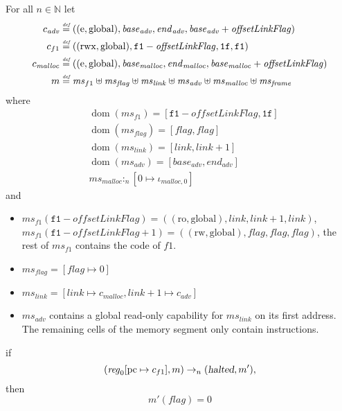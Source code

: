 \documentclass[a4paper]{article}
\newcommand{\forcenewline}{$\phantom{v}$\\}
\newcommand{\update}[2]{[#1 \mapsto #2]}
\newcommand{\defeq}{\stackrel{\textit{\tiny{def}}}{=}}
\DeclareMathOperator{\dom}{dom}
\newcommand{\var}[1]{\mathit{#1}}
\newcommand{\hs}{\var{ms}}
\newcommand{\ms}{\hs}
\newcommand{\pcreg}{\mathrm{pc}}
\newcommand{\start}{\var{base}}
\newcommand{\addrend}{\var{end}}
\newcommand{\reg}{\var{reg}}
\newcommand{\heap}{\var{mem}}
\newcommand{\adv}{\var{adv}}
\newcommand{\link}{\var{link}}
\newcommand{\flag}{\var{flag}}
\newcommand{\olf}{\var{offsetLinkFlag}}
\newcommand{\halted}{\textsl{halted}}
\newcommand{\heapSat}[3][\heap]{#1 :_{#2} #3}
\newcommand{\codelabel}[1]{\mathit{#1}}
\newcommand{\malloc}{\codelabel{malloc}}
\newcommand{\nats}{\mathbb{N}}
\newcommand{\plainperm}[1]{\mathrm{#1}}
\newcommand{\readonly}{\plainperm{ro}}
\newcommand{\readwrite}{\plainperm{rw}}
\newcommand{\entry}{\plainperm{e}}
\newcommand{\rwx}{\plainperm{rwx}}
\newcommand{\glob}{\plainperm{global}}
\newcommand{\step}[1][]{\rightarrow_{#1}}
\begin{document}
\begin{lemma} \forcenewline
  \label{lem:correctness-f1}
  For all $n \in \nats$
  let
  \begin{align*}
    c_{\var{adv}} & \defeq ((\entry,\glob),\start_{\adv},\addrend_{\adv},\start_{\adv}+\olf) \\
    c_{f1} & \defeq ((\rwx,\glob),\mathtt{f1}-\olf,\mathtt{1f},\mathtt{f1}) \\
    c_\malloc & \defeq ((\entry,\glob),\start_\malloc,\addrend_\malloc,\start_\malloc+\olf) \\
    m & \defeq \hs_{f1} \uplus 
        \hs_\flag \uplus                
        \ms_{\var{link}} \uplus 
        \hs_\adv \uplus 
        \ms_{\malloc} \uplus 
        \hs_{\var{frame}} 
  \end{align*}
  where 
  \begin{align*}
    &\dom(\hs_{f1}) = [\mathtt{f1}-\olf,\mathtt{1f}] \\
    &\dom(\hs_\flag) = [\flag,\flag] \\
    &\dom(\ms_\link) = [\link,\link+1]\\
    &\dom(\hs_{\adv}) = [\start_\adv,\addrend_\adv] \\
    &\heapSat[\hs_{\malloc}]{n}{[0 \mapsto \iota_{\malloc,0}]}
  \end{align*}
  and
  \begin{itemize}
  \item $\ms_{f1}(\mathtt{f1}-\olf) = ((\readonly,\glob),\link,\link+1,\link)$, $\ms_{f1}(\mathtt{f1}-\olf+1) = ((\readwrite,\glob),\flag,\flag,\flag)$, the rest of $\hs_{f1}$ contains the code of $f1$.
  \item $\ms_\flag = [\flag \mapsto 0]$
  \item $\ms_{\var{link}} = [\var{link} \mapsto c_\malloc, \var{link} + 1 \mapsto c_\adv]$
  \item $\hs_\adv$ contains a global read-only capability for $\hs_\link$ on its first address. The remaining cells of the memory segment only contain instructions.
  \end{itemize}
  if 
  \[
    (\reg_0\update{\pcreg}{c_{f1}},m) \step[n] (\halted,m'),
  \]
  then
  \[
    m'(\flag) = 0
  \]  
\end{lemma}
\end{document}
